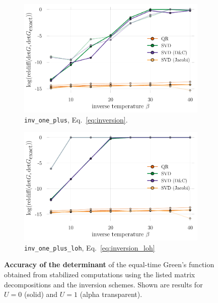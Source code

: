 \documentclass[submission, Phys]{SciPost}
\begin{document}
\begin{figure}
	\centering
	\begin{subfigure}{0.48\textwidth}
		\includegraphics[width=\textwidth]{figures/accuracy_det_svd_regularinv.pdf}
		\caption{\texttt{inv\_one\_plus}, Eq.~\ref{eq:inversion}. \label{fig:det_accuracy_regularinv}}
	\end{subfigure}%
	\hspace{10pt}
	\begin{subfigure}{0.48\textwidth}
		\includegraphics[width=\textwidth]{figures/accuracy_det_svd_loh.pdf}
		\caption{\texttt{inv\_one\_plus\_loh}, Eq.~\ref{eq:inversion_loh} \label{fig:det_accuracy_loh}}
	\end{subfigure}
	\vspace{5pt}
	\caption{\textbf{Accuracy of the determinant} of the equal-time Green's function obtained from stabilized computations using the listed matrix decompositions and the inversion schemes. Shown are results for $U=0$ (solid) and $U=1$ (alpha transparent).}
\end{figure}
\end{document}
